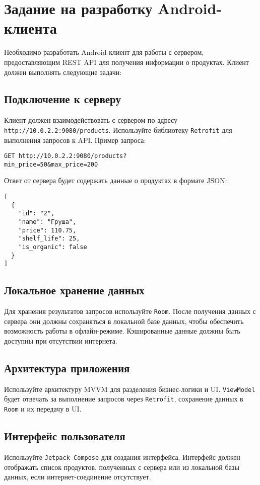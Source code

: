 \section{Задание на разработку Android-клиента}

Необходимо разработать Android-клиент для работы с сервером, предоставляющим REST API для получения информации о продуктах. Клиент должен выполнять следующие задачи:

\subsection{Подключение к серверу}
Клиент должен взаимодействовать с сервером по адресу \texttt{http://10.0.2.2:9080/products}. Используйте библиотеку \texttt{Retrofit} для выполнения запросов к API. Пример запроса:

\begin{verbatim}
GET http://10.0.2.2:9080/products?
min_price=50&max_price=200
\end{verbatim}

Ответ от сервера будет содержать данные о продуктах в формате JSON:

\begin{verbatim}
[
  {
    "id": "2",
    "name": "Груша",
    "price": 110.75,
    "shelf_life": 25,
    "is_organic": false
  }
]
\end{verbatim}

\subsection{Локальное хранение данных}
Для хранения результатов запросов используйте \texttt{Room}. После получения данных с сервера они должны сохраняться в локальной базе данных, чтобы обеспечить возможность работы в офлайн-режиме. Кэшированные данные должны быть доступны при отсутствии интернета.

\subsection{Архитектура приложения}
Используйте архитектуру MVVM для разделения бизнес-логики и UI. \texttt{ViewModel} будет отвечать за выполнение запросов через \texttt{Retrofit}, сохранение данных в \texttt{Room} и их передачу в UI.

\subsection{Интерфейс пользователя}
Используйте \texttt{Jetpack Compose} для создания интерфейса. Интерфейс должен отображать список продуктов, полученных с сервера или из локальной базы данных, если интернет-соединение отсутствует.


